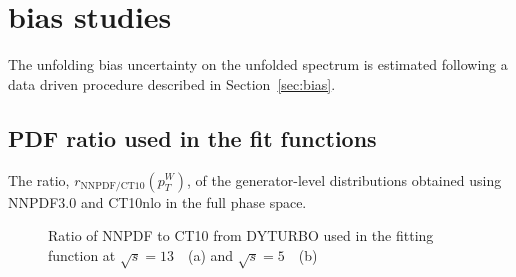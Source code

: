 \section{\ptz bias studies}
\label{sec:zpt_bias_new}




The unfolding bias uncertainty on the unfolded \ptz spectrum is estimated following a data driven procedure described in Section~\ref{sec:bias}.

\subsection{PDF ratio used in the fit functions}
The ratio, $r_\mathrm{NNPDF/CT10}(p_{T}^{W})$, of the generator-level \pt distributions obtained using NNPDF3.0 and CT10nlo in the full phase space.  
\begin{figure}[h]
\centering
{}
\caption{Ratio of NNPDF to CT10 from DYTURBO used in the fitting function at $\sqrt{s} = 13$~\TeV\ (a) and $\sqrt{s} = 5$~\TeV\ (b)}
\label{fig:ct10NNPDF_ratios}
\end{figure}


